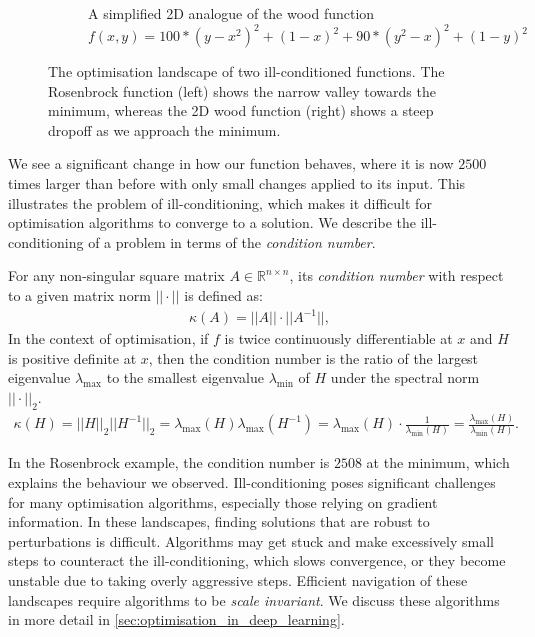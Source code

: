 \begin{figure}[h]
\begin{subfigure}[b]{0.48\linewidth}
        \caption{A simplified 2D analogue of the wood function \\
        $f(x,y) = 100*(y - x^2)^2 + (1 - x)^2 + 90*(y^2 - x)^2 + (1 - y)^2$}
        \label{fig:wood_function}
    \end{subfigure}
    \caption{The optimisation landscape of two ill-conditioned functions. The Rosenbrock function (left) shows the narrow valley towards the minimum, whereas the 2D wood function (right) shows a steep dropoff as we approach the minimum.}
    \label{fig:ill_conditioned_functions}
\end{figure}

We see a significant change in how our function behaves, where it is now $2500$ times larger than before with only small changes applied to its input. This illustrates the problem of ill-conditioning, which makes it difficult for optimisation algorithms to converge to a solution. We describe the ill-conditioning of a problem in terms of the \textit{condition number}.

\begin{definition}
    For any non-singular square matrix $A \in \mathbb{R}^{n \times n}$, its \textit{condition number} with respect to a given matrix norm $||\cdot||$ is defined as:
    \begin{align}
        \kappa(A) = ||A||\cdot||A^{-1}||,
    \end{align}
    In the context of optimisation, if $f$ is twice continuously differentiable at $x$ and $H$ is positive definite at $x$, then the condition number is the ratio of the largest eigenvalue $\lambda_{\max}$ to the smallest eigenvalue $\lambda_{\min}$ of $H$ under the spectral norm $|| \cdot ||_2$. 
    \begin{align}
        \kappa(H) = ||H||_2||H^{-1}||_2 = \lambda_{\max}(H)\lambda_{\max}(H^{-1}) = \lambda_{\max}(H) \cdot \frac{1}{\lambda_{\min}(H)} = \frac{\lambda_{\max}(H)}{\lambda_{\min}(H)}.
    \end{align}
\end{definition}

In the Rosenbrock example, the condition number is $2508$ at the minimum, which explains the behaviour we observed. Ill-conditioning poses significant challenges for many optimisation algorithms, especially those relying on gradient information. In these landscapes, finding solutions that are robust to perturbations is difficult. Algorithms may get stuck and make excessively small steps to counteract the ill-conditioning, which slows convergence, or they become unstable due to taking overly aggressive steps. Efficient navigation of these landscapes require algorithms to be \textit{scale invariant}. We discuss these algorithms in more detail in \cref{sec:optimisation_in_deep_learning}.

